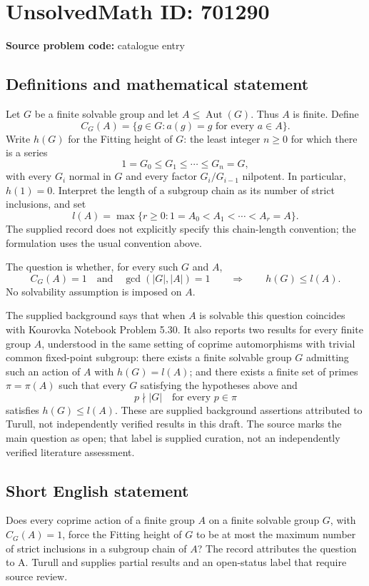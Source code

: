 \documentclass[11pt]{article}
\begin{document}
\section*{UnsolvedMath ID: 701290}
\textbf{Source problem code:} catalogue entry
\subsection{Definitions and mathematical statement}
Let \(G\) be a finite solvable group and let \(A\leq\operatorname{Aut}(G)\). Thus \(A\) is finite. Define
\[
C_G(A)=\{g\in G: a(g)=g\text{ for every }a\in A\}.
\]
Write \(h(G)\) for the Fitting height of \(G\): the least integer \(n\geq0\) for which there is a series
\[
1=G_0\leq G_1\leq\cdots\leq G_n=G,
\]
with every \(G_i\) normal in \(G\) and every factor \(G_i/G_{i-1}\) nilpotent. In particular, \(h(1)=0\). Interpret the length of a subgroup chain as its number of strict inclusions, and set
\[
l(A)=\max\{r\geq0:1=A_0<A_1<\cdots<A_r=A\}.
\]
The supplied record does not explicitly specify this chain-length convention; the formulation uses the usual convention above.

The question is whether, for every such \(G\) and \(A\),
\[
C_G(A)=1\quad\text{and}\quad\gcd(|G|,|A|)=1
\qquad\Longrightarrow\qquad
h(G)\leq l(A).
\]
No solvability assumption is imposed on \(A\).

The supplied background says that when \(A\) is solvable this question coincides with Kourovka Notebook Problem 5.30. It also reports two results for every finite group \(A\), understood in the same setting of coprime automorphisms with trivial common fixed-point subgroup: there exists a finite solvable group \(G\) admitting such an action of \(A\) with \(h(G)=l(A)\); and there exists a finite set of primes \(\pi=\pi(A)\) such that every \(G\) satisfying the hypotheses above and
\[
p\nmid |G|\quad\text{for every }p\in\pi
\]
satisfies \(h(G)\leq l(A)\). These are supplied background assertions attributed to Turull, not independently verified results in this draft. The source marks the main question as open; that label is supplied curation, not an independently verified literature assessment.
\subsection{Short English statement}
Does every coprime action of a finite group \(A\) on a finite solvable group \(G\), with \(C_G(A)=1\), force the Fitting height of \(G\) to be at most the maximum number of strict inclusions in a subgroup chain of \(A\)? The record attributes the question to A. Turull and supplies partial results and an open-status label that require source review.
\end{document}
